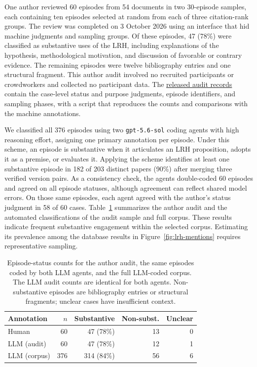 \documentclass[11pt]{article}
\begin{document}
One author reviewed 60 episodes from 54 documents in two 30-episode samples, each containing ten episodes selected at random from each of three citation-rank groups.
The review was completed on 3 October 2026 using an interface that hid machine judgments and sampling groups.
Of these episodes, 47 (78\%) were classified as substantive uses of the LRH, including explanations of the hypothesis, methodological motivation, and discussion of favorable or contrary evidence.
The remaining episodes were twelve bibliography entries and one structural fragment.
This author audit involved no recruited participants or crowdworkers and collected no participant data.
The \href{https://github.com/bheinzerling/linear-representation-hypothesis/tree/main/data/literature/human_audit}{released audit records} contain the case-level status and purpose judgments, episode identifiers, and sampling phases, with a script that reproduces the counts and comparisons with the machine annotations.

We classified all 376 episodes using two \texttt{gpt-5.6-sol} coding agents with high reasoning effort, assigning one primary annotation per episode.
Under this scheme, an episode is substantive when it articulates an LRH proposition, adopts it as a premise, or evaluates it.
Applying the scheme identifies at least one substantive episode in 182 of 203 distinct papers (90\%) after merging three verified version pairs.
As a consistency check, the agents double-coded 60 episodes and agreed on all episode statuses, although agreement can reflect shared model errors.
On those same episodes, each agent agreed with the author's status judgment in 58 of 60 cases.
Table~\ref{tab:lrh-substantive-annotations} summarizes the author audit and the automated classifications of the audit sample and full corpus.
These results indicate frequent substantive engagement within the selected corpus.
Estimating its prevalence among the database results in Figure~\ref{fig:lrh-mentions} requires representative sampling.

\begin{table}[H]
\centering
\small
\setlength{\tabcolsep}{3pt}
\begin{tabular}{@{}lrrrr@{}}
\toprule
Annotation & $n$ & Substantive & Non-subst. & Unclear \\
\midrule
Human & 60 & 47 (78\%) & 13 & 0 \\
LLM (audit) & 60 & 47 (78\%) & 12 & 1 \\
LLM (corpus) & 376 & 314 (84\%) & 56 & 6 \\
\bottomrule
\end{tabular}
\caption{Episode-status counts for the author audit, the same episodes coded by both LLM agents, and the full LLM-coded corpus.
The LLM audit counts are identical for both agents.
Non-substantive episodes are bibliography entries or structural fragments; unclear cases have insufficient context.}
\label{tab:lrh-substantive-annotations}
\end{table}
\end{document}
